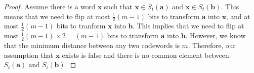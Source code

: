 \documentclass[twoside]{amsart}
\begin{document}
\begin{enumerate}[A.]
      \begin{proof}
         Assume there is a word $\mathbf{x}$ such that $\mathbf{x} \in
         S_t(\mathbf{a})$ and $\mathbf{x}\in S_t( \mathbf{b})$. 
	 This means that we need to flip at most $\frac{1}{2}(m-1)$ bits
	 to transform $\mathbf{a}$ into $\mathbf{x}$, and at most
	 $\frac{1}{2}(m-1)$ bits to tranform $\mathbf{x}$ into $\mathbf{b}$.
	 This implies that we need to flip at most 
	 $\frac{1}{2}(m-1) \times 2 = (m-1)$ bits to transform
	 $\mathbf{a}$ into $\mathbf{b}$. However, we know that the 
	 minimum distance between any two codewords is $m$. Therefore,
	 our assumption that $\mathbf{x}$ exists is false and there is
	 no common element between $S_t(\mathbf{a})$ and $S_t(\mathbf{b})$.
      \end{proof}

\end{enumerate}
\end{document}
